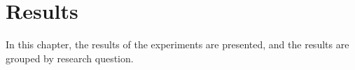 \chapter{Results}
\label{results}


In this chapter, the results of the experiments are presented, and the results are grouped by research question.

